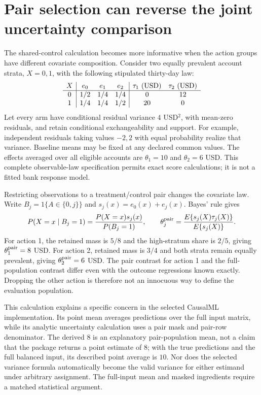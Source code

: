 \section{Pair selection can reverse the joint uncertainty comparison}
\label{exec17:s4-common-population}

The shared-control calculation becomes more informative when the action groups
have different covariate composition. Consider two equally prevalent account
strata, $X=0,1$, with the following stipulated thirty-day law:
\[
\begin{array}{c|ccc|cc}
 X&e_0&e_1&e_2&\tau_1\ ({\rm USD})&\tau_2\ ({\rm USD})\\ \hline
 0&1/2&1/4&1/4&0&12\\
 1&1/4&1/4&1/2&20&0
\end{array}
\]
Let every arm have conditional residual variance $4$ USD$^2$, with
mean-zero residuals, and retain conditional exchangeability and support.
For example, independent residuals taking values $-2,2$ with equal
probability realize that variance. Baseline means may be fixed at any
declared common values. The effects averaged over all eligible accounts are
$\theta_1=10$ and $\theta_2=6$ USD. This complete observable-law specification
permits exact score calculations; it is not a fitted bank response model.
\citep{exec17_s4_extension}

Restricting observations to a treatment/control pair changes the covariate
law. Write $B_j=1\{A\in\{0,j\}\}$ and
$s_j(x)=e_0(x)+e_j(x)$. Bayes' rule gives
\begin{equation}
 P(X=x\mid B_j=1)=\frac{P(X=x)s_j(x)}{P(B_j=1)},\qquad
 \theta_j^{\rm pair}=
       \frac{E\{s_j(X)\tau_j(X)\}}{E\{s_j(X)\}}.
 \label{exec17:s4-pair-target}
\end{equation}
For action 1, the retained mass is $5/8$ and the high-stratum share is
$2/5$, giving $\theta_1^{\rm pair}=8$ USD. For action 2, retained mass is
$3/4$ and both strata remain equally prevalent, giving
$\theta_2^{\rm pair}=6$ USD. The pair contrast for action 1 and the
full-population contrast differ even with the outcome regressions known
exactly. Dropping the other action is therefore not an innocuous way to
define the evaluation population.

This calculation explains a specific concern in the selected CausalML
implementation. Its point mean averages predictions over the full input
matrix, while its analytic uncertainty calculation uses a pair mask and
pair-row denominator. The derived $8$ is an explanatory pair-population
mean, not a claim that the package returns a point estimate of $8$; with
the true predictions and the full balanced input, its described point
average is $10$. Nor does the selected variance formula automatically
become the valid variance for either estimand under arbitrary assignment.
The full-input mean and masked ingredients require a matched statistical
argument.\citep{exec14_causalml_primary}

